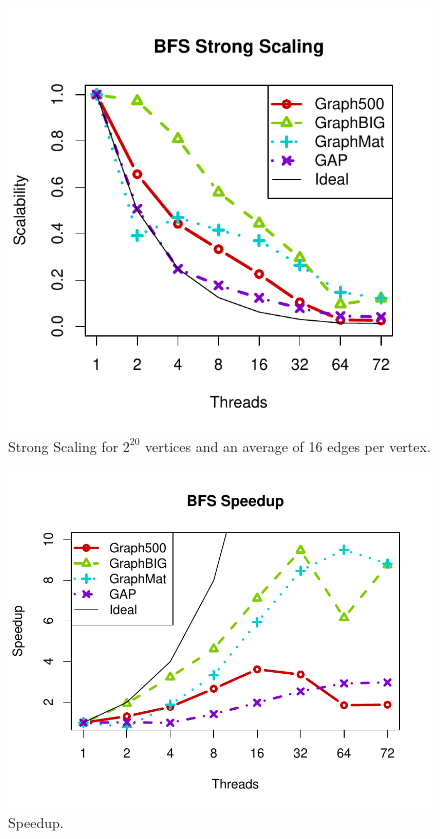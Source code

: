 \documentclass{llncs}
\begin{document}
\begin{figure}
	\centering
	\includegraphics[width=0.8\columnwidth, trim=0 36pt 18pt 0, clip]{graphics/bfs_ss.pdf}
	\caption{Strong Scaling for $2^{20}$ vertices and an average of 16 edges per vertex.}
	\label{fig:bfs-ss}
\end{figure}

\begin{figure}
	\centering
	\includegraphics[width=\columnwidth, trim=0 36pt 18pt 0, clip]{graphics/bfs_speedup.pdf}
	\caption{Speedup.}
	\label{fig:bfs-speedup}
\end{figure}
\end{document}
